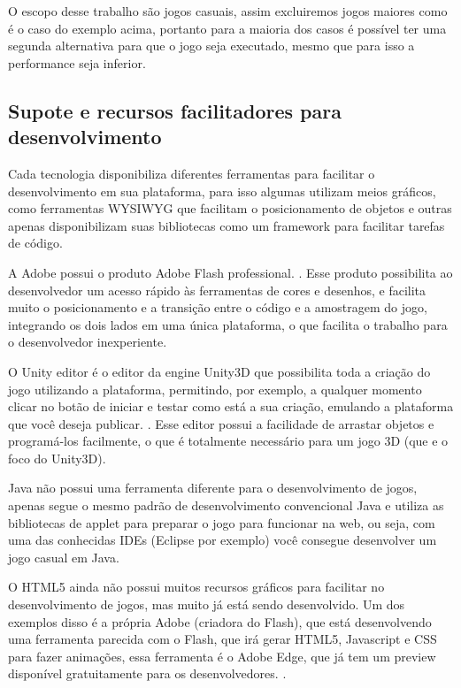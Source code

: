 O escopo desse trabalho são jogos casuais, assim excluiremos jogos
maiores como é o caso do exemplo acima, portanto para a maioria dos
casos é possível ter uma segunda alternativa para que o jogo seja
executado, mesmo que para isso a performance seja inferior.

\subsection{Supote e recursos facilitadores para desenvolvimento}

Cada tecnologia disponibiliza diferentes ferramentas para facilitar o
desenvolvimento em sua plataforma, para isso algumas utilizam meios
gráficos, como ferramentas WYSIWYG que facilitam o posicionamento de
objetos e outras apenas disponibilizam suas bibliotecas como um
framework para facilitar tarefas de código.

A Adobe possui o produto Adobe Flash professional. \cite{website:adobeflash}.
Esse produto possibilita ao desenvolvedor um acesso rápido às ferramentas de cores
e desenhos, e facilita muito o posicionamento e a transição entre o
código e a amostragem do jogo, integrando os dois lados em uma única
plataforma, o que facilita o trabalho para o desenvolvedor
inexperiente.

O Unity editor é o editor da engine Unity3D que possibilita toda a
criação do jogo utilizando a plataforma, permitindo, por exemplo, a
qualquer momento clicar no botão de iniciar e testar como está a sua
criação, emulando a plataforma que você deseja publicar. \cite{website:unity3d}.
Esse editor possui a facilidade de arrastar objetos e programá-los
facilmente, o que é totalmente necessário para um jogo 3D (que e o
foco do Unity3D).

Java não possui uma ferramenta diferente para o desenvolvimento de
jogos, apenas segue o mesmo padrão de desenvolvimento convencional
Java e utiliza as bibliotecas de applet para preparar o jogo para
funcionar na web, ou seja, com uma das conhecidas IDEs (Eclipse por
exemplo) você consegue desenvolver um jogo casual em Java.

O HTML5 ainda não possui muitos recursos gráficos para facilitar no
desenvolvimento de jogos, mas muito já está sendo desenvolvido. Um dos
exemplos disso é a própria Adobe (criadora do Flash), que está
desenvolvendo uma ferramenta parecida com o Flash, que irá gerar
HTML5, Javascript e CSS para fazer animações, essa ferramenta é o
Adobe Edge, que já tem um preview disponível
gratuitamente para os desenvolvedores. \cite{website:adobeedge}.

